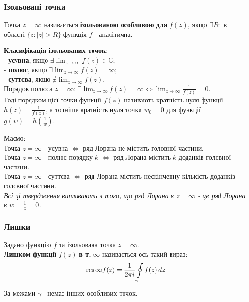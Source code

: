 \documentclass{math_library}
\begin{document}
\subsubsection{Ізольовані точки}
\begin{definition}
Точка $z=\infty$ називається \textbf{ізольованою особливою для} $f(z)$, якщо $\exists R:$ в області $\{z: |z|>R\}$ функція $f$ - аналітична.
\end{definition}

\textbf{Класифікація ізольованих точок}:\\
	 - \textbf{усувна}, якщо $\displaystyle\exists \lim_{z \to \infty} f(z) \in \mathbb{C}$;\\
	 - \textbf{полюс}, якщо $\displaystyle\exists \lim_{z \to \infty} f(z) = \infty$;\\
	 - \textbf{суттєва}, якщо $\displaystyle \nexists \lim_{z \to \infty} f(z)$.
	 \bigskip \\
Порядок полюса $z = \infty$:
$\displaystyle \exists \lim_{z \to \infty} f(z) = \infty \iff \lim_{z \to \infty} \frac{1}{f(z)} = 0$.\\
Тоді порядком цієї точки функції $f(z)$ називають кратність нуля функції $\displaystyle h(z) = \frac{1}{f(z)}$, а точніше кратність нуля точки $w_0 = 0$ для функції $\displaystyle g(w) = h\left(\frac{1}{w}\right)$.

\begin{proposition} Маємо:\\
Точка $z = \infty$ - усувна $\iff$ ряд Лорана не містить головної частини.\\
Точка $z = \infty$ - полюс порядку $k$ $\iff$ ряд Лорана містить $k$ доданків головної частини.\\
Точка $z = \infty$ - суттєва $\iff$ ряд Лорана містить нескінченну кількість доданків головної частини.\\
\textit{Всі ці твердження випливають з того, що ряд Лорана в $z = \infty$ - це ряд Лорана в $\displaystyle w = \frac{1}{z} = 0$.}
\end{proposition}

\subsubsection{Лишки}
\begin{definition}
Задано функцію $f$ та ізольована точка $z = \infty$.\\
\textbf{Лишком функції} $f(z)$ \textbf{в т.} $\infty$ називається ось такий вираз:
\begin{align*}
\operatorname*{res}{\infty}{f(z)} = \frac{1}{2 \pi i} \oint\displaylimits_{\gamma_-} f(z)\,dz
\end{align*}
За межами $\gamma_-$ немає інших особливих точок.
\end{definition}
\end{document}
